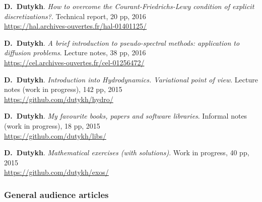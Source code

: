 \documentclass[final, a4paper, oneside, 12pt]{article}
\numberwithin{equation}{section}
\begin{document}
\begin{etaremune}

  \item \textbf{D.~Dutykh}. \textit{How to overcome the Courant-Friedrichs-Lewy condition of explicit discretizations?}. Technical report, 20 pp, 2016 \\ %
  \url{https://hal.archives-ouvertes.fr/hal-01401125/}
  
  \item \textbf{D.~Dutykh}. \textit{A brief introduction to pseudo-spectral methods: application to diffusion problems}. Lecture notes, 38 pp, 2016 \\ %
  \url{https://cel.archives-ouvertes.fr/cel-01256472/}
  
  \item \textbf{D.~Dutykh}. \textit{Introduction into Hydrodynamics. Variational point of view}. Lecture notes (work in progress), 142 pp, 2015 \\ %
  \url{https://github.com/dutykh/hydro/}
  
  \item \textbf{D.~Dutykh}. \textit{My favourite books, papers and software libraries}. Informal notes (work in progress), 18 pp, 2015 \\ %
  \url{https://github.com/dutykh/libs/}
  
  \item \textbf{D.~Dutykh}. \textit{Mathematical exercises (with solutions)}. Work in progress, 40 pp, 2015 \\ %
  \url{https://github.com/dutykh/exos/}
  
\end{etaremune}

\subsubsection{General audience articles}
\end{document}
